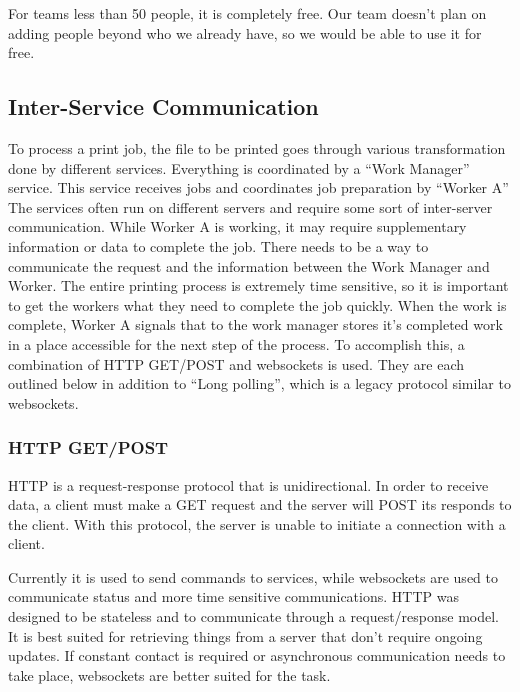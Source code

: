 \documentclass[onecolumn, draftclsnofoot,10pt, compsoc]{IEEEtran}
\begin{document}
For teams less than 50 people, it is completely free.
Our team doesn’t plan on adding people beyond who we already have, so we would be able to use it for free.

\subsection{Inter-Service Communication}
To process a print job, the file to be printed goes through various transformation done by different services.
Everything is coordinated by a “Work Manager” service.
This service receives jobs and coordinates job preparation by “Worker A”
The services often run on different servers and require some sort of inter-server communication.
While Worker A is working, it may require supplementary information or data to complete the job.
There needs to be a way to communicate the request and the information between the Work Manager and Worker.
The entire printing process is extremely time sensitive, so it is important to get the workers what they need to complete the job quickly.
When the work is complete, Worker A signals that to the work manager stores it’s completed work in a place accessible for the next step of the process.
To accomplish this, a combination of HTTP GET/POST and websockets is used.
They are each outlined below in addition to “Long polling”, which is a legacy protocol similar to websockets.

\subsubsection{HTTP GET/POST}
HTTP is a request-response protocol that is unidirectional.
In order to receive data, a client must make a GET request and the server will POST its responds to the client.
With this protocol, the server is unable to initiate a connection with a client.

Currently it is used to send commands to services, while websockets are used to communicate status and more time sensitive communications.
HTTP was designed to be stateless and to communicate through a request/response model.
It is best suited for retrieving things from a server that don’t require ongoing updates.
If constant contact is required or asynchronous communication needs to take place, websockets are better suited for the task.
\end{document}
